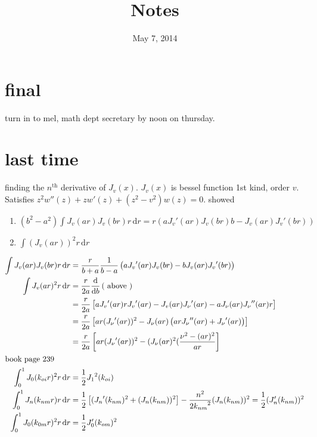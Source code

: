 \documentclass{article}
\begin{document}
\title{Notes}
\date{May 7, 2014}
\maketitle
\section*{final}
turn in to mel, math dept secretary by noon on thursday.
\section*{last time}
finding the $n^\text{th}$ derivative of $J_v(x)$. $J_v(x)$ is bessel function 1st kind, order $v$. Satisfies $z^2w''(z)+zw'(z)+(z^2-v^2)w(z)=0$. showed
\begin{enumerate}
\item
  $(b^2-a^2)\int{J_v(ar)J_v(br)r\,\mathrm{d}r}=r\left(a{J_v}'(ar)J_v(br)b-J_v(ar){J_v}'(br)\right)$
\item
$\int{(J_v(ar))^2r\,\mathrm{d}r}$
\end{enumerate}
\begin{align*}
  \int{J_v(ar)J_v(br)r\,\mathrm{d}r}&=\frac{r}{b+a}\frac{1}{b-a}\left(a{J_v}'(ar)J_v(br)-bJ_v(ar){J_v}'(br)\right)\\
  \int{J_v(ar)^2r\,\mathrm{d}r}&=\frac{r}{2a}\frac{\mathrm{d}}{\mathrm{d}b}\left(\text{ above }\right)\\
  &=\frac{r}{2a}\left[a{J_v}'(ar)r{J_v}'(ar)-J_v(ar){J_\nu}'(ar)-aJ_\nu(ar){J_\nu}''(ar)r\right]\\
  &=\frac{r}{2a}\left[ar({J_\nu}'(ar))^2-J_\nu(ar)\left(ar{J_\nu}''(ar)+{J_\nu}'(ar)\right)\right]\\
  &=\frac{r}{2a}\left[ar({J_\nu}'(ar))^2-(J_\nu(ar)^2(\frac{\nu^2-(ar)^2}{ar}\right]\\
  \intertext{book page 239}
  \int_0^1{J_0(k_{oi}r)^2r\,\mathrm{d}r}&=\frac{1}{2}{J_1}^2(k_{oi})\\
  \int_0^1{J_n(k_{nm}r)r\,\mathrm{d}r}&=\frac{1}{2}\left[({J_n}'(k_{nm})^2+(J_n(k_{nm}))^2\right]-\frac{n^2}{2{k_{nm}}^2}(J_{n}(k_{nm}))^2=\frac{1}{2}(J_n'(k_{nm}))^2\\
  \int_0^1{J_0(k_{0m}r)^2r\,\mathrm{d}r}&=\frac{1}{2}J_0'(k_{om})^2
\end{align*}
\end{document}
